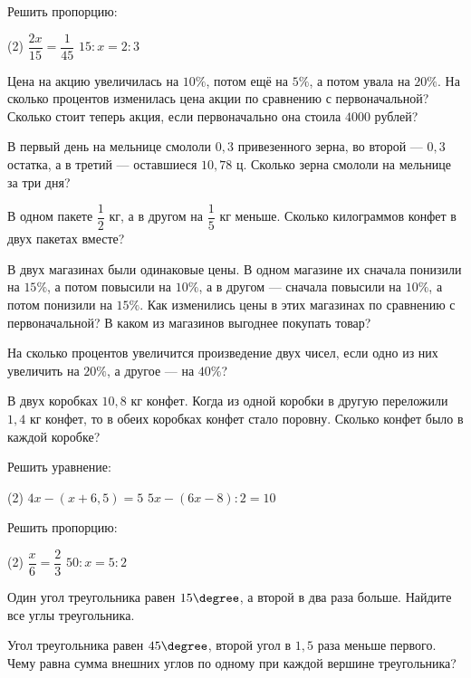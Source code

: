 \begin{homework}[number=2]
	\begin{listofex}
		\item Решить пропорцию:
		\begin{tasks}(2)
			\task \( \dfrac{2x}{15}=\dfrac{1}{45} \)
			\task \( 15:x=2:3\)
		\end{tasks}
		\item Цена на акцию увеличилась на \(10\%\), потом ещё на \(5\%\), а потом увала на \(20\%\). На сколько процентов изменилась цена акции по сравнению с первоначальной? Сколько стоит теперь акция, если первоначально она стоила \(4000\) рублей?
		\item В первый день на мельнице смололи \(0,3\) привезенного зерна, во второй --- \(0,3\) остатка, а в третий --- оставшиеся \(10,78\) ц. Сколько зерна смололи на мельнице за три дня?
		\item В одном пакете \( \dfrac{1}{2} \) кг, а в другом на \(\dfrac{1}{5}\) кг меньше.
		Сколько килограммов конфет в двух пакетах вместе?
	\end{listofex}
\end{homework}

\begin{homework}[number=3]
	\begin{listofex}
		\item В двух магазинах были одинаковые цены. В одном магазине их сначала понизили на \(15\%\), а потом повысили на \(10\%\), а в другом --- сначала повысили на \(10\%\), а потом понизили на \(15\%\). Как изменились цены в этих магазинах по сравнению с первоначальной? В каком из магазинов выгоднее покупать товар?
		\item На сколько процентов увеличится произведение двух чисел, если одно из них увеличить на \(20\%\), а другое --- на \( 40\% \)?
		\item В двух коробках \(10,8\) кг конфет. Когда из одной коробки в другую переложили \(1,4\) кг конфет, то в обеих коробках конфет стало поровну. Сколько конфет было в каждой коробке?
		\item Решить уравнение:
		\begin{tasks}(2)
			\task \( 4x-(x+6,5)=5 \)
			\task \( 5x - (6x-8):2 = 10 \)
		\end{tasks}
		\item Решить пропорцию:
		\begin{tasks}(2)
			\task \( \dfrac{x}{6}=\dfrac{2}{3} \)
			\task \( 50:x=5:2\)
		\end{tasks}
		\item Один угол треугольника равен \( 15\degree \), а второй в два раза больше. Найдите все углы треугольника.
		\item Угол треугольника равен \( 45\degree \), второй угол в \( 1,5 \) раза меньше первого. Чему равна сумма внешних углов по одному при каждой вершине треугольника?
	\end{listofex}
\end{homework}

